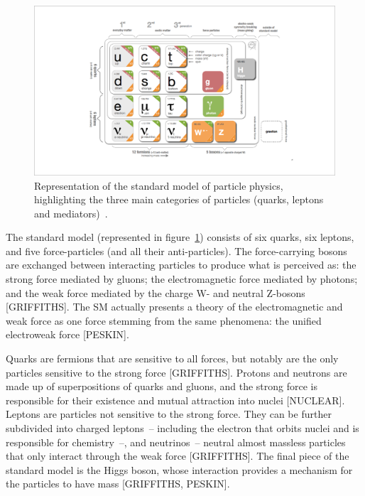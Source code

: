 \begin{figure}
    \centering
    \includegraphics[width = \textwidth]{figures/standardmodel_galbraith_carsten.png}
    \caption{Representation of the standard model of particle physics, highlighting the three main categories of particles (quarks, leptons and mediators)~\cite{galbraith_ux_2013}.}
    \label{fig:standard_model}
\end{figure}

The standard model (represented in figure~\ref{fig:standard_model}) consists of six quarks, six leptons, and five force-particles (and all their anti-particles). The force-carrying bosons are exchanged between interacting particles to produce what is perceived as: the strong force mediated by gluons; the electromagnetic force mediated by photons; and the weak force mediated by the charge W- and neutral Z-bosons [GRIFFITHS]. The SM actually presents a theory of the electromagnetic and weak force as one force stemming from the same phenomena: the unified electroweak force [PESKIN]. 

Quarks are fermions that are sensitive to all forces, but notably are the only particles sensitive to the strong force [GRIFFITHS]. Protons and neutrons are made up of superpositions of quarks and gluons, and the strong force is responsible for their existence and mutual attraction into nuclei [NUCLEAR]. Leptons are particles not sensitive to the strong force. They can be further subdivided into charged leptons~-- including the electron that orbits nuclei and is responsible for chemistry~--, and neutrinos~-- neutral almost massless particles that only interact through the weak force [GRIFFITHS]. The final piece of the standard model is the Higgs boson, whose interaction provides a mechanism for the particles to have mass [GRIFFITHS, PESKIN].


